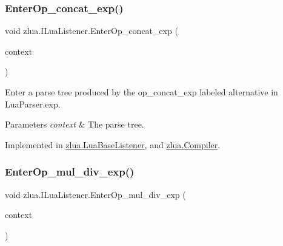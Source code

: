 \subsubsection{\texorpdfstring{Enter\+Op\+\_\+concat\+\_\+exp()}{EnterOp\_concat\_exp()}}
{\footnotesize\ttfamily void zlua.\+I\+Lua\+Listener.\+Enter\+Op\+\_\+concat\+\_\+exp (\begin{DoxyParamCaption}\item[{\mbox{[}\+Not\+Null\mbox{]} \mbox{\hyperlink{classzlua_1_1_lua_parser_1_1_op__concat__exp_context}{Lua\+Parser.\+Op\+\_\+concat\+\_\+exp\+Context}}}]{context }\end{DoxyParamCaption})}



Enter a parse tree produced by the {\ttfamily op\+\_\+concat\+\_\+exp} labeled alternative in Lua\+Parser.\+exp. 


\begin{DoxyParams}{Parameters}
{\em context} & The parse tree.\\
\hline
\end{DoxyParams}


Implemented in \mbox{\hyperlink{classzlua_1_1_lua_base_listener_afa38e97552715d422e07b0de65ea18b1}{zlua.\+Lua\+Base\+Listener}}, and \mbox{\hyperlink{classzlua_1_1_compiler_ab34e6520919145a9c302e6847e8b36b7}{zlua.\+Compiler}}.

\mbox{\label{interfacezlua_1_1_i_lua_listener_adceb73b6f7d7f84737f72b1a5c5fe4d6}} 
\subsubsection{\texorpdfstring{Enter\+Op\+\_\+mul\+\_\+div\+\_\+exp()}{EnterOp\_mul\_div\_exp()}}
{\footnotesize\ttfamily void zlua.\+I\+Lua\+Listener.\+Enter\+Op\+\_\+mul\+\_\+div\+\_\+exp (\begin{DoxyParamCaption}\item[{\mbox{[}\+Not\+Null\mbox{]} \mbox{\hyperlink{classzlua_1_1_lua_parser_1_1_op__mul__div__exp_context}{Lua\+Parser.\+Op\+\_\+mul\+\_\+div\+\_\+exp\+Context}}}]{context }\end{DoxyParamCaption})}



